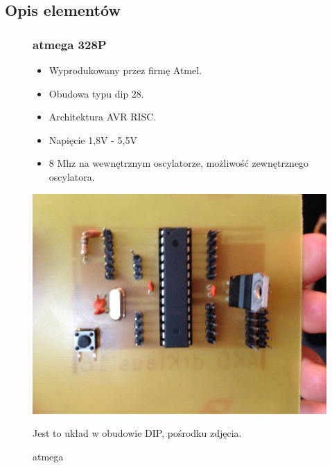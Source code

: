 \documentclass[a4paper,11pt]{article}
\def\SCALE{0.6}
\begin{document}
\subsection{Opis elementów}

\begin{figure}[H]
	\subsubsection{atmega 328P}
		\begin{itemize}
			\item Wyprodukowany przez firmę Atmel.
			\item Obudowa typu dip 28.
			\item Architektura AVR RISC.
			\item Napięcie 1,8V - 5,5V
			\item 8 Mhz na wewnętrznym oscylatorze, możliwość zewnętrznego oscylatora.
		\end{itemize}
		
	
	\centering
	\includegraphics[width=\SCALE
	\paperwidth]{plytkaGotowa}
	\caption{atmega}
	Jest to układ w obudowie DIP, pośrodku zdjęcia.
\end{figure}
\end{document}
